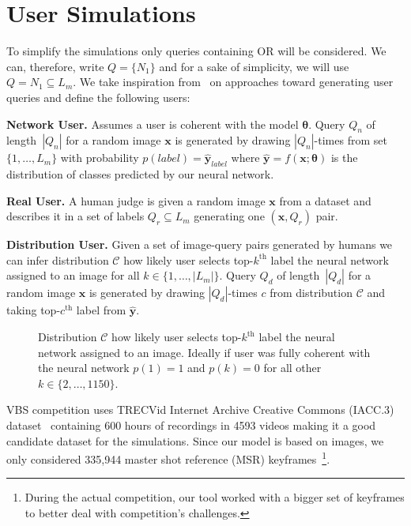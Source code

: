 \section{User Simulations}
To simplify the simulations only queries containing \textsf{OR} will be considered. We can, therefore, write $Q=\{N_1\}$ and for a sake of simplicity, we will use $Q=N_1\subseteq L_m$.
We take inspiration from~\cite{kovalvcik2017comparison} on approaches toward generating user queries and define the following users:
\begin{description}[labelwidth=1em, leftmargin=!]
	\item \textbf{Network User.} Assumes a user is coherent with the model $\bm{\theta}$. Query $Q_{n}$ of length~$|Q_{n}|$ for a random image $\bm{x}$ is generated by drawing $|Q_{n}|$-times from set $\{1,\dots,L_m\}$ with probability $p(label)=\bm{\hat{y}}_{label}$ where $\bm{\hat{y}}=f\left(\bm{x}; \bm{\theta}\right)$ is the distribution of classes predicted by our neural network.
	\item \textbf{Real User.} A human judge is given a random image $\bm{x}$ from a dataset and describes it in a set of labels $Q_r\subseteq L_m$ generating one $(\bm{x},Q_r)$ pair.
	\item \textbf{Distribution User.} Given a set of image-query pairs generated by humans we can infer distribution $\mathcal{C}$ how likely user selects top-$k^{\mathrm{th}}$ label the neural network assigned to an image for all $k\in\{1,\dots,|L_m|\}$.
	Query $Q_{d}$ of length~$|Q_{d}|$ for a random image $\bm{x}$ is generated by drawing $|Q_{d}|$-times $c$ from distribution $\mathcal{C}$ and taking top-$c^{\mathrm{th}}$ label from $\bm{\hat{y}}$.
\end{description}
\begin{figure}
	\centering
	
	
	\caption[Agreement between user and neural network labeling]{Distribution $\mathcal{C}$ how likely user selects top-$k^{\mathrm{th}}$ label the neural network assigned to an image. Ideally if user was fully coherent with the neural network $p(1)=1$ and $p(k)=0$ for all other $k\in\{2,\dots,1150\}$.
	}
	\label{fig:class_distribution}
\end{figure}
VBS competition uses TRECVid Internet Archive Creative Commons (IACC.3) dataset~\cite{awad2016trecvid} containing 600 hours of recordings in 4593 videos making it a good candidate dataset for the simulations. Since our model is based on images, we only considered 335,944 master shot reference (MSR) keyframes~\cite{MasterShotReference}\footnote{During the actual competition, our tool worked with a bigger set of keyframes to better deal with competition's challenges.}.

